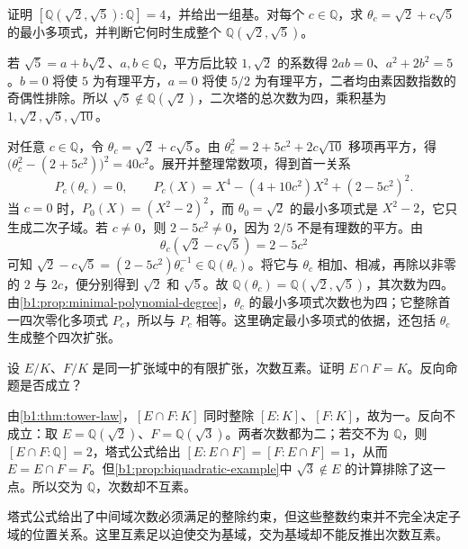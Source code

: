 \begin{exercise}\label{b1:ex:14-3}
	证明 \(\left[\mathbb Q(\sqrt2,\sqrt5):\mathbb Q\right]=4\)，并给出一组基。对每个 \(c\in\mathbb Q\)，求 \(\theta_c=\sqrt2+c\sqrt5\) 的最小多项式，并判断它何时生成整个 \(\mathbb Q(\sqrt2,\sqrt5)\)。
\end{exercise}
\begin{solution}
	若 \(\sqrt5=a+b\sqrt2\)、\(a,b\in\mathbb Q\)，平方后比较 \(1,\sqrt2\) 的系数得 \(2ab=0\)、\(a^2+2b^2=5\)。\(b=0\) 将使 \(5\) 为有理平方，\(a=0\) 将使 \(5/2\) 为有理平方，二者均由素因数指数的奇偶性排除。所以 \(\sqrt5\notin\mathbb Q(\sqrt2)\)，二次塔的总次数为四，乘积基为 \(1,\sqrt2,\sqrt5,\sqrt{10}\)。

	对任意 \(c\in\mathbb Q\)，令 \(\theta_c=\sqrt2+c\sqrt5\)。由 \(\theta_c^2=2+5c^2+2c\sqrt{10}\) 移项再平方，得 \(\bigl(\theta_c^2-(2+5c^2)\bigr)^2=40c^2\)。展开并整理常数项，得到首一关系
	\[
		P_c(\theta_c)=0,\qquad P_c(X)=X^4-(4+10c^2)X^2+(2-5c^2)^2.
	\]
	当 \(c=0\) 时，\(P_0(X)=(X^2-2)^2\)，而 \(\theta_0=\sqrt2\) 的最小多项式是 \(X^2-2\)，它只生成二次子域。若 \(c\neq0\)，则 \(2-5c^2\neq0\)，因为 \(2/5\) 不是有理数的平方。由
	\[
		\theta_c(\sqrt2-c\sqrt5)=2-5c^2
	\]
	可知 \(\sqrt2-c\sqrt5=(2-5c^2)\theta_c^{-1}\in\mathbb Q(\theta_c)\)。将它与 \(\theta_c\) 相加、相减，再除以非零的 \(2\) 与 \(2c\)，便分别得到 \(\sqrt2\) 和 \(\sqrt5\)。故 \(\mathbb Q(\theta_c)=\mathbb Q(\sqrt2,\sqrt5)\)，其次数为四。由\cref{b1:prop:minimal-polynomial-degree}，\(\theta_c\) 的最小多项式次数也为四；它整除首一四次零化多项式 \(P_c\)，所以与 \(P_c\) 相等。这里确定最小多项式的依据，还包括 \(\theta_c\) 生成整个四次扩张。
\end{solution}

\begin{exercise}\label{b1:ex:14-4}
	设 \(E/K\)、\(F/K\) 是同一扩张域中的有限扩张，次数互素。证明 \(E\cap F=K\)。反向命题是否成立？
\end{exercise}
\begin{solution}
	由\cref{b1:thm:tower-law}，\([E\cap F:K]\) 同时整除 \([E:K]\)、\([F:K]\)，故为一。反向不成立：取 \(E=\mathbb Q(\sqrt2)\)、\(F=\mathbb Q(\sqrt3)\)。两者次数都为二；若交不为 \(\mathbb Q\)，则 \([E\cap F:\mathbb Q]=2\)，塔式公式给出 \([E:E\cap F]=[F:E\cap F]=1\)，从而 \(E=E\cap F=F\)。但\cref{b1:prop:biquadratic-example}中 \(\sqrt3\notin E\) 的计算排除了这一点。所以交为 \(\mathbb Q\)，次数却不互素。

	塔式公式给出了中间域次数必须满足的整除约束，但这些整数约束并不完全决定子域的位置关系。这里互素足以迫使交为基域，交为基域却不能反推出次数互素。
\end{solution}

